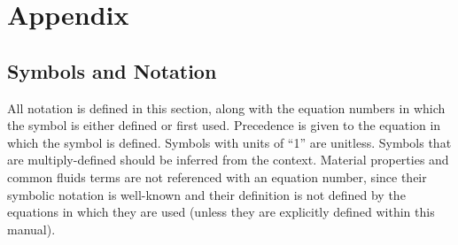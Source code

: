 \documentclass[10pt]{article}
\numberwithin{equation}{section} %
\begin{document}
\clearpage
\section{Appendix}

\subsection{Symbols and Notation}
All notation is defined in this section, along with the equation numbers in which the symbol is either defined or first used. Precedence is given to the equation in which the symbol is defined. Symbols with units of ``1'' are unitless. Symbols that are multiply-defined should be inferred from the context. Material properties and common fluids terms are not referenced with an equation number, since their symbolic notation is well-known and their definition is not defined by the equations in which they are used (unless they are explicitly defined within this manual).\newline
\end{document}
